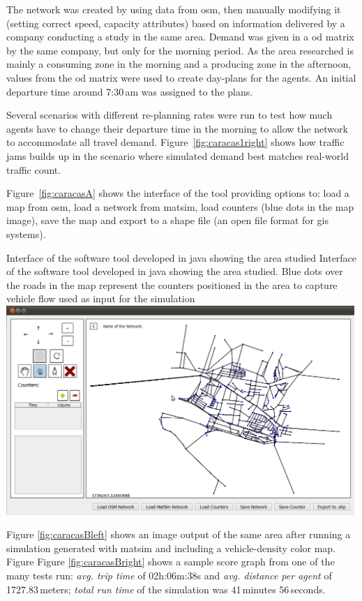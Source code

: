 The network was created by using data from \gls{osm}, then manually modifying it (\ie setting correct speed, capacity attributes) based on information delivered by a company conducting a study in the same area. Demand was given in a \gls{od} matrix by the same company, but only for the morning period. As the area researched is mainly a consuming zone in the morning and a producing zone in the afternoon, values from the \gls{od} matrix were used to create day-plans for the agents. An initial departure time around 7:30\,am was assigned to the plans.

Several scenarios with different re-planning rates were run to test how much agents have to change their departure time in the morning to allow the network to accommodate all travel demand. Figure~\ref{fig:caracas1right} shows how traffic jams builds up in the scenario where simulated demand best matches real-world traffic count.

Figure~\ref{fig:caracasA} shows the interface of the tool providing options to: load a map from \gls{osm}, load a network from \gls{matsim}, load counters (blue dots in the map image), save the map and export to a shape file (an open file format for \gls{gis} systems).

\createfigure%
{Interface of the software tool developed in \gls{java} showing the area studied}%
{Interface of the software tool developed in \gls{java} showing the area studied. Blue dots over the roads in the map represent the counters positioned in the area to capture vehicle flow used as input for the simulation}%
{\label{fig:caracasA}}%
{\includegraphics[width=0.99\textwidth, angle=0]{./scenarios/figures/caracasA.png}}%
{}

Figure \ref{fig:caracasBleft} shows an image output of the same area after running a simulation generated with \gls{matsim} and including a vehicle-density color map. Figure Figure \ref{fig:caracasBright} shows a sample score graph from one of the many tests run: \textit{avg. trip time} of 02h:06m:38s and \emph{avg. distance per agent} of 1727.83\,meters; \textit{total run time} of the simulation was 41\,minutes 56\,seconds.

